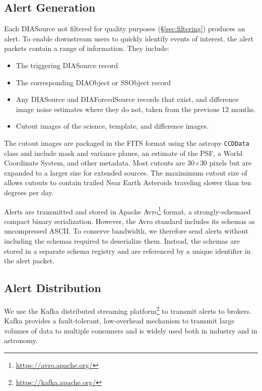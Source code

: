 
\subsection{Alert Generation}

Each DIASource not filtered for quality purposes (\S \ref{sec:filtering}) produces an alert.
To enable downstream users to quickly identify events of interest, the alert packets contain a range of information.  
They include:

\begin{itemize}
    \item The triggering DIASource record
    \item The corresponding DIAObject or SSObject record
    \item Any DIASource and DIAForcedSource records that exist, and difference image noise estimates where they do not, taken from the previous 12 months.
    \item Cutout images of the science, template, and difference images.
\end{itemize}

The cutout images are packaged in the FITS format using the astropy \texttt{CCDData} class and include mask and variance planes, an estimate of the PSF, a World Coordinate System, and other metadata.
Most cutouts are 30$\times$30 pixels but are expanded to a larger size for extended sources.
The maximimum cutout size of  allows cutouts to contain trailed Near Earth Asteroids traveling slower than ten degrees per day.

Alerts are transmitted and stored in Apache Avro\footnote{\url{https://avro.apache.org/}} format, a strongly-schemaed compact binary serialization.
However, the Avro standard includes its schemas as uncompressed ASCII.
To conserve bandwidth, we therefore send alerts without including the schemas required to deserialize them.
Instead, the schemas are stored in a separate schema registry and are referenced by a unique identifier in the alert packet.


\subsection{Alert Distribution} \label{sec:alertdist}

We use the Kafka distributed streaming platform\footnote{\url{https://kafka.apache.org/}} to transmit alerts to brokers.
Kafka provides a fault-tolerant, low-overhead mechanism to transmit large volumes of data to multiple consumers and is widely used both in industry and in astronomy. 


